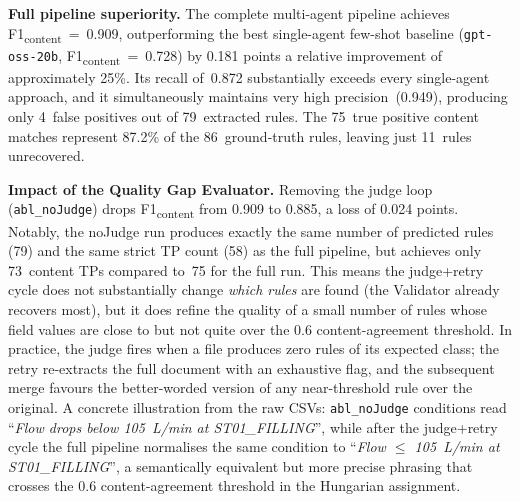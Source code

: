 ﻿\documentclass[11pt]{article}
\begin{document}
\textbf{Full pipeline superiority.}
The complete multi-agent pipeline achieves
F1\textsubscript{content}~=~0.909, outperforming the best single-agent few-shot
baseline (\texttt{gpt-oss-20b}, F1\textsubscript{content}~=~0.728) by 0.181 points
  a relative improvement of approximately 25\%.
Its recall of~0.872 substantially exceeds every single-agent approach, and it
simultaneously maintains very high precision~(0.949), producing only 4~false
positives out of 79~extracted rules.
The 75~true positive content matches represent 87.2\% of the 86~ground-truth rules,
leaving just 11~rules unrecovered.

\textbf{Impact of the Quality Gap Evaluator.}
Removing the judge loop (\texttt{abl\_noJudge}) drops
F1\textsubscript{content} from 0.909 to 0.885, a loss of 0.024 points.
Notably, the noJudge run produces exactly the same number of predicted rules
(79) and the same strict TP count (58) as the full pipeline, but achieves
only 73~content TPs compared to~75 for the full run.
This means the judge+retry cycle does not substantially change \emph{which rules}
are found (the Validator already recovers most), but it does refine the quality of
a small number of rules whose field values are close to but not quite over the
$0.6$ content-agreement threshold.
In practice, the judge fires when a file produces zero rules of its expected
class; the retry re-extracts the full document with an exhaustive flag, and
the subsequent merge favours the better-worded version of any near-threshold
rule over the original.  A concrete illustration from the raw CSVs: \texttt{abl\_noJudge}
conditions read ``\textit{Flow drops below 105~L/min at ST01\_FILLING}'', while
after the judge+retry cycle the full pipeline normalises the same condition to
``\textit{Flow $\leq$ 105~L/min at ST01\_FILLING}'', a semantically equivalent
but more precise phrasing that crosses the $0.6$ content-agreement threshold in
the Hungarian assignment.
\end{document}
